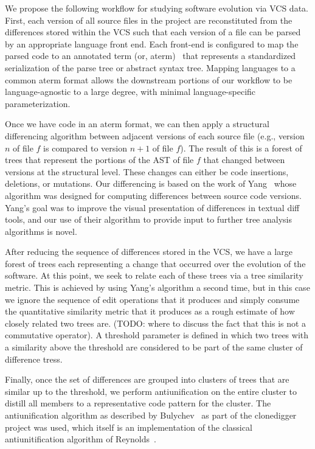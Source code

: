 \documentclass{acm_proc_article-sp}
\begin{document}
We propose the following workflow for studying software evolution via VCS
data.  First, each version of all source files in the project are
reconstituted from the differences stored within the VCS such that each
version of a file can be parsed by an appropriate language front end.  Each
front-end is configured to map the parsed code to an annotated term (or,
aterm)~\cite{brand00aterm} that represents a standardized serialization of the parse
tree or abstract syntax tree.  Mapping languages to a common aterm format allows
the downstream portions of our workflow to be language-agnostic to a large degree,
with minimal language-specific parameterization.  

Once we have code in an aterm format, we can then apply a structural
differencing algorithm between adjacent versions of each source file (e.g.,
version $n$ of file $f$ is compared to version $n+1$ of file $f$).  The result
of this is a forest of trees that represent the portions of the AST of file
$f$ that changed between versions at the structural level.  These changes can
either be code insertions, deletions, or mutations.  Our differencing is based
on the work of Yang~\cite{yang91diff} whose algorithm was designed for computing
differences between source code versions.  Yang's goal was to improve the
visual presentation of differences in textual diff tools, and our use of their
algorithm to provide input to further tree analysis algorithms is novel.

After reducing the sequence of differences stored in the VCS, we have a large
forest of trees each representing a change that occurred over the evolution of
the software.  At this point, we seek to relate each of these trees via a 
tree similarity metric.  This is achieved by using Yang's algorithm a second time,
but in this case we ignore the sequence of edit operations that it produces and
simply consume the quantitative similarity metric that it produces as a rough
estimate of how closely related two trees are.  (TODO: where to discuss the fact that
this is not a commutative operator).  A threshold parameter is defined in which
two trees with a similarity above the threshold are considered to be part of the same
cluster of difference tress.

Finally, once the set of differences are grouped into clusters of trees that
are similar up to the threshold, we perform antiunification on the entire
cluster to distill all members to a representative code pattern for the
cluster.  The antiunification algorithm as described by
Bulychev~\cite{bulychev08dupe} as part of the clonedigger project
was used, which itself is an implementation of the classical antiunitification
algorithm of Reynolds~\cite{reynolds69antiunification}.
\end{document}
